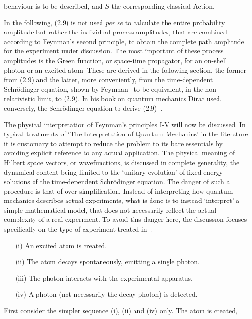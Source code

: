 \documentclass [12pt]{article}
\begin{document}
{     behaviour is to be described, and $S$ the corresponding classical Action.
     \par In the following, (2.9) is not used {\it per se} to calculate the entire probability
      amplitude but rather the individual process amplitudes, that are combined according to
      Feynman's second principle, to obtain the complete path amplitude for the
      experiment under discussion. The most important of these process amplitudes is the Green function,
     or space-time propagator, for an on-shell photon or an excited atom.
      These are derived in the following section, the former from
     (2.9) and the latter, more conveniently, from the time-dependent
      Schr\"{o}dinger equation, shown by Feynman~\cite{Feyn5,Feyn6} to be equivalent, in
      the non-relativistic limit, to (2.9).
      In his book on quantum mechanics Dirac used, conversely, the Schr\"{o}dinger equation
      to derive (2.9)~\cite{Dirac1}.
      \par The physical interpretation of Feynman's principles I-V will now be discussed.
    In typical treatments of `The Interpretation of Quantum Mechanics' in the literature
     it is customary to attempt to reduce the problem to its bare essentials by avoiding
    explicit reference to any actual application. The physical meaning of Hilbert space
    vectors, or wavefunctions, is discussed in complete generality, the dynamical content
    being limited to the `unitary evolution' of fixed energy solutions of the
    time-dependent Schr\"{o}dinger equation. The danger of such a procedure is that of
    over-simplification. Instead of interpreting how quantum mechanics describes actual
    experiments, what is done is to instead `interpret' a simple mathematical model, that
    does not necessarily reflect the actual complexity of a real experiment.
    To avoid this danger here, the discussion focuses specifically on the type of experiment
    treated in~\cite{Feyn1}:
    \begin{itemize}
     \item[(i)] An excited atom is created.
     \item[(ii)] The atom decays spontaneously, emitting a single photon.
      \item[(iii)] The photon interacts with the experimental apparatus.
      \item[(iv)] A photon (not necessarily the decay photon) is detected.
     \end{itemize}
     First consider the simpler sequence (i), (ii) and (iv) only. The atom is created,
}
\end{document}
